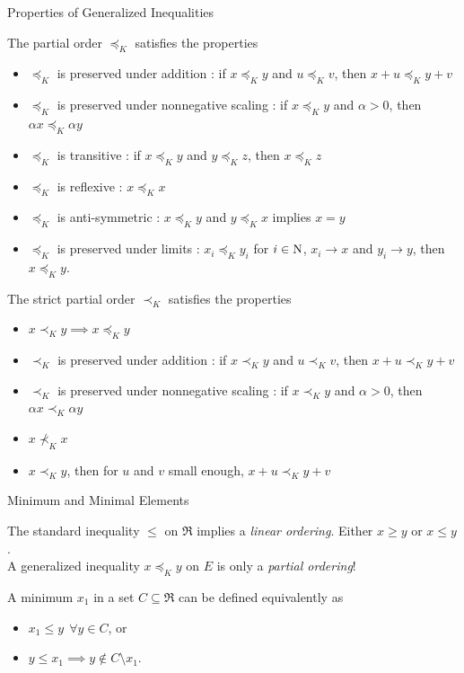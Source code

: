 \documentclass[9pt]{beamer}
\begin{document}
\begin{frame}{Properties of Generalized Inequalities}

  The partial order $\preceq_{K}$ satisfies the properties
  \begin{itemize}
  \item $\preceq_{K}$ is preserved under addition : if $x \preceq_{K} y$ and $u \preceq_{K} v$, then
    $x+u\preceq_K y+v$
  \item $\preceq_{K}$ is preserved under nonnegative scaling : if $x \preceq_{K} y$ and $\alpha>0$, then $\alpha x \preceq_{K} \alpha y$
  \item $\preceq_{K}$ is transitive : if $x\preceq_{K} y$ and $y\preceq_{K}z$, then $x \preceq_{K} z$
  \item $\preceq_{K}$ is reflexive : $x\preceq_{K} x$
  \item $\preceq_{K}$ is anti-symmetric : $x\preceq_{K}y$ and $y \preceq_{K} x$ implies $x=y$
  \item $\preceq_{K}$ is preserved under limits : $x_i\preceq_{K} y_i$ for $i\in \mathrm{N}$, $x_i\to x$ and $y_i\to y$, then $x\preceq_{K} y$.
  \end{itemize}

  \vfill
  
  The strict partial order $\prec_K$ satisfies the properties
  \begin{itemize}
  \item $x \prec_K y \implies x\preceq_K y$
  \item $\prec_{K}$ is preserved under addition : if $x \prec_{K} y$ and $u \prec_{K} v$, then
    $x+u\prec_K y+v$
  \item $\prec_{K}$ is preserved under nonnegative scaling : if $x \prec_{K} y$ and $\alpha>0$, then $\alpha x \prec_{K} \alpha y$
  \item $x \not\prec_K x$
  \item $x\prec_K y$, then for $u$ and $v$ small enough, $x+u\prec_K y+v$
  \end{itemize}


  

\end{frame}

\begin{frame}{Minimum and Minimal Elements}

  The standard inequality $\leq$ on $\Re$ implies a \emph{linear ordering}. Either $x\geq y$ or $x\leq y$.\\
  A generalized inequality $x\preceq_K y$ on $E$ is only a \emph{partial ordering}!

  \vfill
  
  A minimum $x_1$ in a set $C\subseteq \Re$ can be defined equivalently as
  \begin{itemize}
  \item $x_1\leq y~~\forall y \in C$, or
  \item $y\leq x_1 \implies y\not\in C\setminus{x_1}$.
  \end{itemize}
  
\end{frame}
\end{document}
